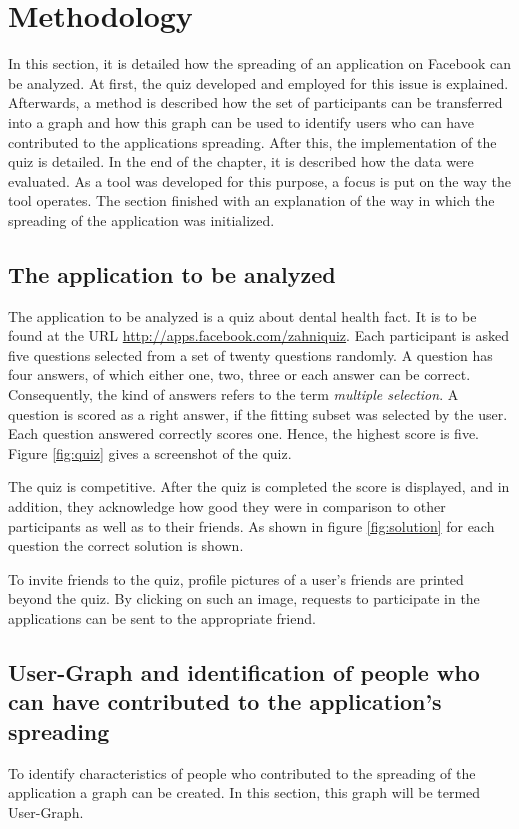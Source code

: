 \documentclass[preprint,12pt]{elsarticle}
\begin{document}
\section{Methodology}
\label{sec:method}
In this section, it is detailed how the spreading of an application on
Facebook can be analyzed. At first, the quiz developed and employed for this issue is
explained. Afterwards, a method is described how the set of
participants can be transferred into a graph and how this
graph can be used to identify users who can have contributed to the applications
spreading. After this, the implementation of the quiz is detailed. In
the end of the chapter, it is described how the data were
evaluated. As a tool was developed for this purpose, a focus is put on
the way the tool  operates. The section finished with an explanation of
the way in which the spreading of the application was initialized.

\subsection{The application to be analyzed}
\label{sec:aboutQuiz}
The application to be analyzed is a quiz about dental health fact. It is to be
found at the URL \url{http://apps.facebook.com/zahniquiz}.
Each participant is asked five questions selected
from a set of twenty questions randomly. A question has four answers, of
which either one, two, three or each answer can be
correct. Consequently,
the kind of answers refers to the term \textit{multiple selection}.
A question is scored as a right answer, if the fitting subset was
selected by the user. 
Each question answered correctly scores one. Hence, the
highest score is five. Figure \ref{fig:quiz} gives a screenshot of the quiz. 

The quiz is competitive. After the quiz is completed the score is
displayed, and in addition, they acknowledge how good they were in 
comparison to other participants as well as to their 
friends. As shown in figure \ref{fig:solution} for each question the
correct solution is shown. 

To invite friends to the quiz, profile
pictures of a user's friends are 
printed beyond the quiz. By clicking on such an image,  requests to
participate in the applications 
can be sent to the appropriate friend.


\subsection{User-Graph and identification of people who can have contributed to the application's spreading}
\label{sec:user-graph-ident}
To identify characteristics of people who contributed to the spreading
of the application a graph can be created. In this section, this graph
will be termed User-Graph.
\end{document}

